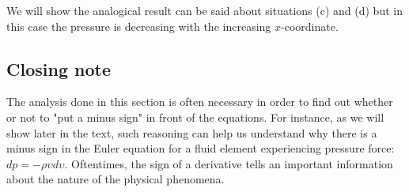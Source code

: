 We will show the analogical result can be said about situations (c) and (d) but in this case the pressure is decreasing with the increasing $x$-coordinate.



\subsection{Closing note}

The analysis done in this section is often necessary in order to find out whether or not to "put a minus sign" in front of the equations. For instance, as we will show later in the text, such reasoning can help us understand why there is a minus sign in the Euler equation for a fluid element experiencing pressure force: $dp = - \rho \upsilon d \upsilon$. Oftentimes, the sign of a derivative tells an important information about the nature of the physical phenomena.






